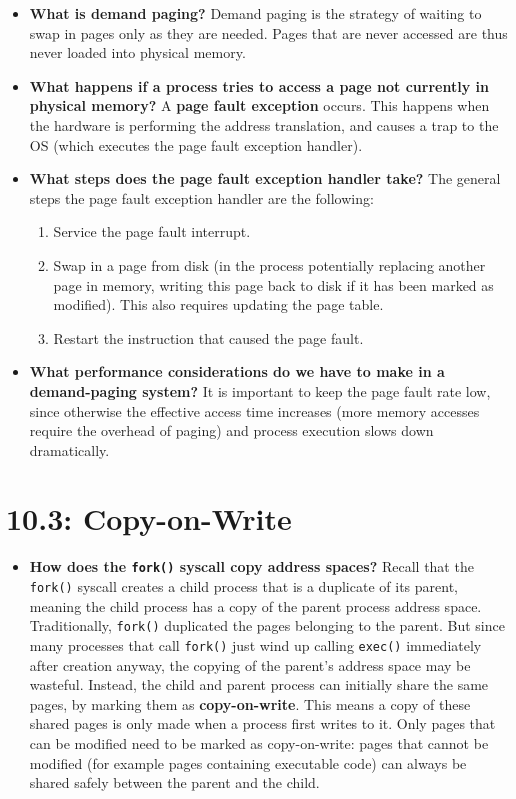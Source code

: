 \documentclass[12pt]{article}
\begin{document}
\begin{itemize}
    \item \textbf{What is demand paging?} Demand paging is the strategy of waiting to swap in pages only as they are needed. Pages that are never accessed are thus never loaded into physical memory.
    \item \textbf{What happens if a process tries to access a page not currently in physical memory?} A \textbf{page fault exception} occurs. This happens when the hardware is performing the address translation, and causes a trap to the OS (which executes the page fault exception handler).
    \item \textbf{What steps does the page fault exception handler take?} The general steps the page fault exception handler are the following:
        \begin{enumerate}
            \item Service the page fault interrupt.
            \item Swap in a page from disk (in the process potentially replacing another page in memory, writing this page back to disk if it has been marked as modified). This also requires updating the page table.
            \item Restart the instruction that caused the page fault.
        \end{enumerate}
    \item \textbf{What performance considerations do we have to make in a demand-paging system?} It is important to keep the page fault rate low, since otherwise the effective access time increases (more memory accesses require the overhead of paging) and process execution slows down dramatically.
\end{itemize}

\section*{10.3: Copy-on-Write}

\begin{itemize}
    \item \textbf{How does the \texttt{fork()} syscall copy address spaces?} Recall that the \texttt{fork()} syscall creates a child process that is a duplicate of its parent, meaning the child process has a copy of the parent process address space. Traditionally, \texttt{fork()} duplicated the pages belonging to the parent. But since many processes that call \texttt{fork()} just wind up calling \texttt{exec()} immediately after creation anyway, the copying of the parent's address space may be wasteful. Instead, the child and parent process can initially share the same pages, by marking them as \textbf{copy-on-write}. This means a copy of these shared pages is only made when a process first writes to it. Only pages that can be modified need to be marked as copy-on-write: pages that cannot be modified (for example pages containing executable code) can always be shared safely between the parent and the child.
\end{itemize}
\end{document}
